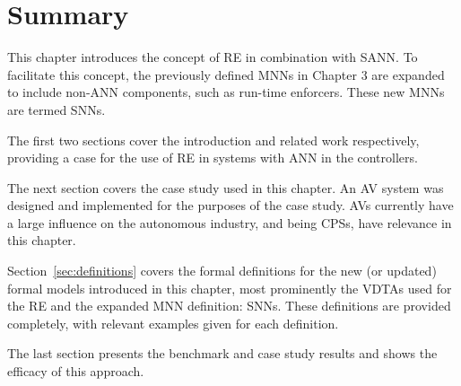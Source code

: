 \section{Summary}
This chapter introduces the concept of \acf{RE} in combination with \acf{SANN}.
To facilitate this concept, the previously defined \acfp{MNN} in Chapter 3 are expanded to include non-\ac{ANN} components, such as run-time enforcers.
These new \acp{MNN} are termed \acfp{SNN}.

The first two sections cover the introduction and related work respectively, providing a case for the use of \ac{RE} in systems with \ac{ANN} in the controllers.

The next section covers the case study used in this chapter.
An \acf{AV} system was designed and implemented for the purposes of the case study.
\acp{AV} currently have a large influence on the autonomous industry, and being \acfp{CPS}, have relevance in this chapter.

Section~\ref{sec:definitions} covers the formal definitions for the new (or updated) formal models introduced in this chapter, most prominently the \acfp{VDTA} used for the \ac{RE} and the expanded \ac{MNN} definition: \acp{SNN}.
These definitions are provided completely, with relevant examples given for each definition.

The last section presents the benchmark and case study results and shows the efficacy of this approach.
